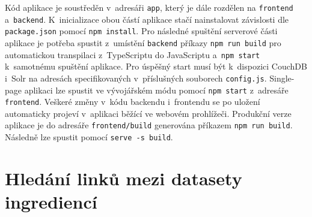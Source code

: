 \documentclass[12pt,a4paper]{report}
\begin{document}
Kód aplikace je soustředěn v~adresáři \texttt{app}, který je dále rozdělen na \texttt{frontend} a~\texttt{backend}. K~inicializace obou částí aplikace stačí nainstalovat závislosti dle \texttt{package.json} pomocí \texttt{npm\,install}. Pro následné spuštění serverové části aplikace je potřeba spustit z~umístění \texttt{backend} příkazy \texttt{npm\,run\,build} pro automatickou transpilaci z~TypeScriptu do JavaScriptu a~\texttt{npm\,start} k~samotnému spuštění aplikace. Pro úspěšný start musí být k~dispozici CouchDB i~Solr na adresách specifikovaných v~příslušných souborech \texttt{config.js}. Single-page aplikaci lze spustit ve vývojářském módu pomocí \texttt{npm\,start} z~adresáře \texttt{frontend}. Veškeré změny v~kódu backendu i~frontendu se po uložení automaticky projeví v~aplikaci běžící ve webovém prohlížeči. Produkční verze aplikace je do adresáře \texttt{frontend/build} generována příkazem \texttt{npm\,run\,build}. Následně lze spustit pomocí \texttt{serve\,-s\,build}.

\pagebreak
\section{Hledání linků mezi datasety ingrediencí}
\end{document}
